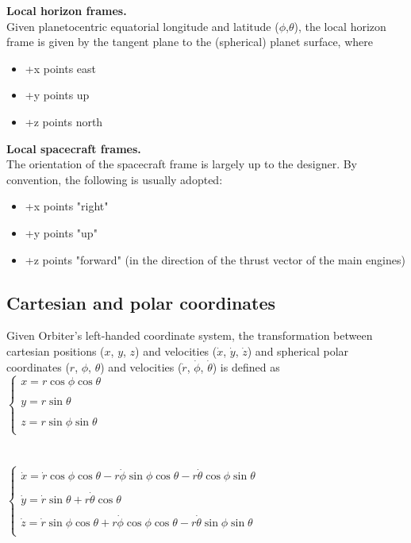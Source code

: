 \documentclass[Orbiter Technical Reference.tex]{subfiles}
\begin{document}
\noindent
\textbf{Local horizon frames.}\\
Given planetocentric equatorial longitude and latitude ($\phi$,$\theta$), the local horizon frame is given by the tangent plane to the (spherical) planet surface, where

\begin{itemize}
\item +x points east
\item +y points up
\item +z points north
\end{itemize}

\noindent
\textbf{Local spacecraft frames.}\\
The orientation of the spacecraft frame is largely up to the designer. By convention, the following is usually adopted:

\begin{itemize}
\item +x points "right"
\item +y points "up"
\item +z points "forward" (in the direction of the thrust vector of the main engines)
\end{itemize}

\noindent

\subsection{Cartesian and polar coordinates}
\label{ssec:cartpol_coord}
Given Orbiter's left-handed coordinate system, the transformation between cartesian positions ($x$, $y$, $z$) and velocities ($\dot{x}$, $\dot{y}$, $\dot{z}$) and spherical polar coordinates ($r$, $\phi$, $\theta$) and velocities ($\dot{r}$, $\dot{\phi}$, $\dot{\theta}$) is defined as\\

$
\left\{
\begin{array}{l}
x = r \cos\phi \cos\theta \\\\
y = r \sin\theta \\\\
z = r \sin\phi \sin\theta \\
\end{array} 
\right .
$
\\
\\
\\
\indent
$
\left\{
\begin{array}{l}
\dot{x} = \dot{r} \cos\phi \cos\theta - r \dot{\phi} \sin\phi\cos\theta - r \dot{\theta} \cos\phi\sin\theta \\\\
\dot{y} = \dot{r} \sin\theta + r \dot{\theta} \cos\theta \\\\
\dot{z} = \dot{r} \sin\phi \cos\theta + r \dot{\phi} \cos\phi\cos\theta - r \dot{\theta} \sin\phi\sin\theta \\
\end{array} 
\right .
$
\end{document}
